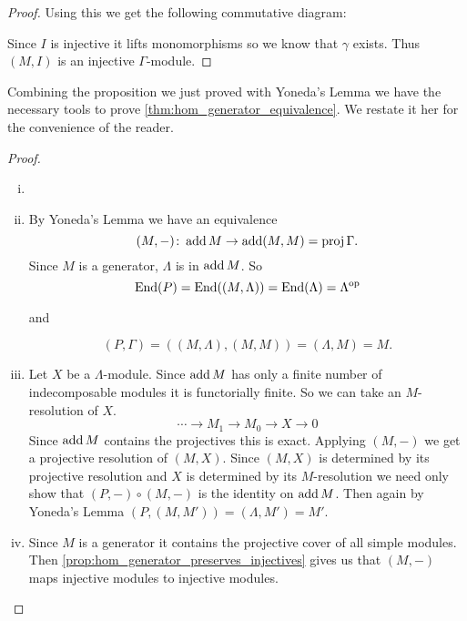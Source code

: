 \begin{prop}
\begin{proof}
		Using this we get the following commutative diagram:
		\begin{center}
		\end{center}
		Since $I$ is injective it lifts monomorphisms so we know that $\gamma$ exists. Thus $(M, I)$ is an injective $\Gamma$-module.
	\end{proof}
\end{prop}

Combining the proposition we just proved with Yoneda's Lemma we have the necessary tools to prove \cref{thm:hom_generator_equivalence}. We restate it her for the convenience of the reader.
\Wederburnequivalence*
\begin{proof}
	\begin{enumerate}[i)]
		\item[]
		\item By Yoneda's Lemma we have an equivalence $$(M,-)\colon\operatorname{add} M \to \operatorname{add} (M,M)=\operatorname{proj}\Gamma.$$ Since $M$ is a generator, $\Lambda$ is in $\operatorname{add} M$. So 
		$$\operatorname{End}(P)=\operatorname{End}((M,\Lambda)) = \operatorname{End}(\Lambda)=\Lambda^{\operatorname{op}}$$ 
		\begin{center}
			and
		\end{center}
		$$(P,\Gamma)=((M,\Lambda),(M,M))=(\Lambda,M)=M.$$
		\item Let $X$ be a $\Lambda$-module. Since $\operatorname{add} M$ has only a finite number of indecomposable modules it is functorially finite.  So we can take an $M$-resolution of $X$.
		$$\cdots \to M_1 \to M_0 \to X \to 0$$
		Since $\operatorname{add} M$ contains the projectives this is exact. Applying $(M,-)$ we get a projective resolution of $(M,X)$. Since $(M, X)$ is determined by its projective resolution and $X$ is determined by its $M$-resolution we need only show that $(P,-)\circ (M,-)$ is the identity on $\operatorname{add} M$. Then again by Yoneda's Lemma $(P, (M, M')) = (\Lambda, M')=M'$.
		\item Since $M$ is a generator it contains the projective cover of all simple modules. Then \cref{prop:hom_generator_preserves_injectives} gives us that $(M, -)$ maps injective modules to injective modules.
	\end{enumerate}
\end{proof}

